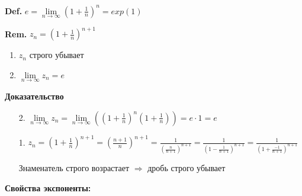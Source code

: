 \documentclass[14pt, letter paper]{article}
\begin{document}
\textbf{Def.} $e = \lim\limits_{n \rightarrow \infty}{(1 + \frac{1}{n})^n} = exp(1)$

\textbf{Rem.} $z_n = (1 + \frac{1}{n})^{n+1}$

\begin{enumerate}
    \item $z_n$ строго убывает
    \item $\lim\limits_{n \rightarrow \infty}{z_n} = e$
\end{enumerate}

\begin{center}
    \textbf{Доказательство}
\end{center}

\begin{enumerate}
    \item[2.] $\lim\limits_{n \rightarrow \infty}{z_n} = \lim\limits_{n \rightarrow \infty}{((1 + \frac{1}{n})^n(1 + \frac{1}{n}))} = e \cdot 1 = e$ 
    \item[1.] $z_n = (1 + \frac{1}{n})^{n+1} = (\frac{n+1}{n})^{n+1} = \frac{1}{(\frac{n}{n+1})^{n+1}} = \frac{1}{(1 - \frac{1}{n+1})^{n+1}} = \frac{1}{(1 + \frac{-1}{n+1})^{n+1}}$

    Знаменатель строго возрастает $\Rightarrow$ дробь строго убывает
\end{enumerate}

\textbf{Свойства экспоненты:}
\end{document}
